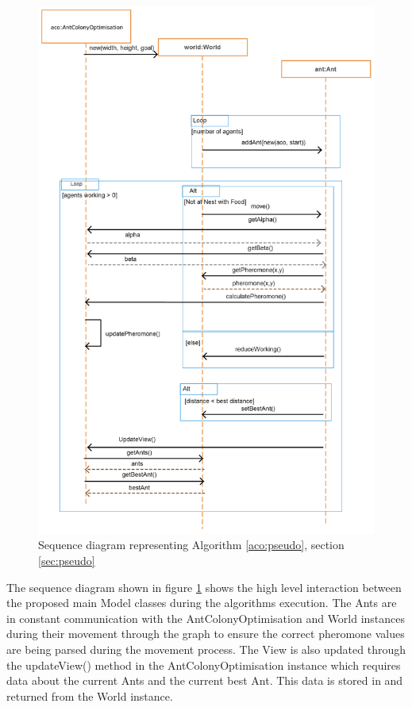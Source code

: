 \clearpage
\begin{figure}
\includegraphics[scale = 0.3]{Images/design/sequenceRes}
\caption[Overall Sequence Diagram]{Sequence diagram representing Algorithm \ref{aco:pseudo}, section \ref{sec:pseudo}}
\label{fig:seq}
\end{figure}
\clearpage

The sequence diagram shown in figure \ref{fig:seq} shows the high level interaction between the proposed main Model classes during the algorithms execution. The Ants are in constant communication with the AntColonyOptimisation and World instances during their movement through the graph to ensure the correct pheromone values are being parsed during the movement process. The View is also updated through the updateView() method in the AntColonyOptimisation instance which requires data about the current Ants and the current best Ant. This data is stored in and returned from the World instance.

